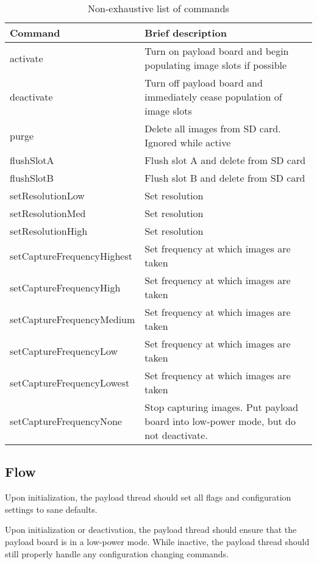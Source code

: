 \documentclass{article}
\begin{document}
\begin{table}
\begin{center}
\caption{Non-exhaustive list of commands}
\begin{tabular}{| l | l |}
    \hline 
    Command & Brief description \\ \hline
    activate & Turn on payload board and begin populating image slots if possible \\ \hline
    deactivate & Turn off payload board and immediately cease population of image slots \\ \hline
    purge & Delete all images from SD card. Ignored while active \\ \hline
    flushSlotA & Flush slot A and delete from SD card \\ \hline
    flushSlotB & Flush slot B and delete from SD card \\ \hline
    setResolutionLow & Set resolution\\ \hline
    setResolutionMed & Set resolution\\ \hline
    setResolutionHigh & Set resolution\\ \hline
    setCaptureFrequencyHighest & Set frequency at which images are taken\\ \hline
    setCaptureFrequencyHigh & Set frequency at which images are taken\\ \hline
    setCaptureFrequencyMedium & Set frequency at which images are taken\\ \hline
    setCaptureFrequencyLow & Set frequency at which images are taken\\ \hline
    setCaptureFrequencyLowest & Set frequency at which images are taken\\ \hline
    setCaptureFrequencyNone & Stop capturing images. Put payload board into low-power mode, but do not deactivate.\\ \hline
\end{tabular}
\end{center}
\end{table}

\subsection{Flow}
Upon initialization, the payload thread should set all flags and configuration
settings to sane defaults.

Upon initialization or deactivation, the payload thread should ensure that the 
payload board is in a low-power mode. While inactive, the payload thread should
still properly handle any configuration changing commands.
\end{document}
